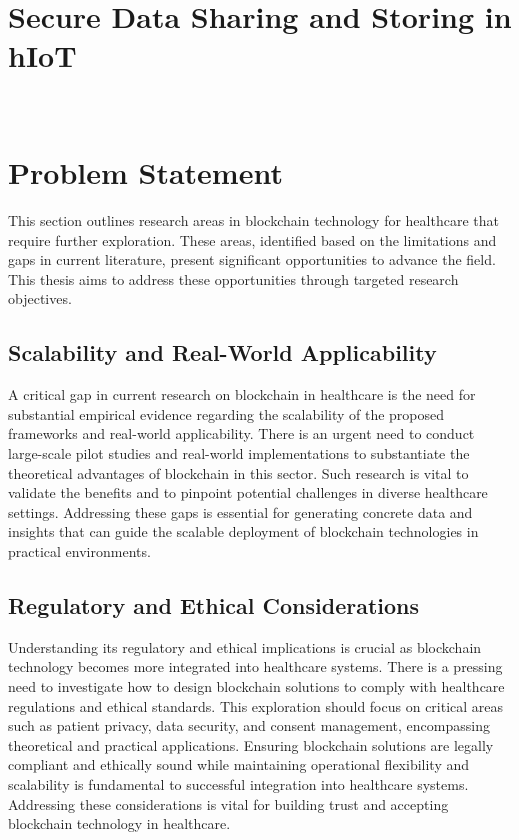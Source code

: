 \documentclass[cic,tc,english]{iiufrgs}
\begin{document}
    

    \section{Secure Data Sharing and Storing in hIoT}
        \label{sec:securedata}\

    \section{Problem Statement}
        \label{sec:problemstatement}

        This section outlines research areas in blockchain technology for healthcare that require further exploration. These areas, identified based on the limitations and gaps in current literature, present significant opportunities to advance the field. This thesis aims to address these opportunities through targeted research objectives.

        \subsection{Scalability and Real-World Applicability} 
            A critical gap in current research on blockchain in healthcare is the need for substantial empirical evidence regarding the scalability of the proposed frameworks and real-world applicability. There is an urgent need to conduct large-scale pilot studies and real-world implementations to substantiate the theoretical advantages of blockchain in this sector. Such research is vital to validate the benefits and to pinpoint potential challenges in diverse healthcare settings. Addressing these gaps is essential for generating concrete data and insights that can guide the scalable deployment of blockchain technologies in practical environments.

        \subsection{Regulatory and Ethical Considerations} 
            Understanding its regulatory and ethical implications is crucial as blockchain technology becomes more integrated into healthcare systems. There is a pressing need to investigate how to design blockchain solutions to comply with healthcare regulations and ethical standards. This exploration should focus on critical areas such as patient privacy, data security, and consent management, encompassing theoretical and practical applications. Ensuring blockchain solutions are legally compliant and ethically sound while maintaining operational flexibility and scalability is fundamental to successful integration into healthcare systems. Addressing these considerations is vital for building trust and accepting blockchain technology in healthcare.
\end{document}

